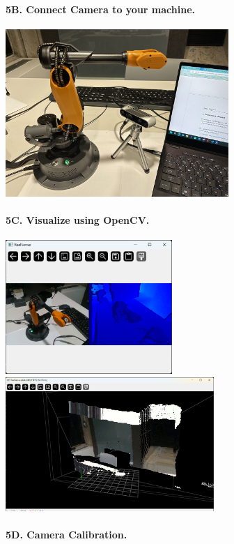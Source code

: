\paragraph{5B. Connect Camera to your machine.}
\begin{center}
    \includegraphics[height=2.5in]{image/5b.jpg}
\end{center}

\newpage
\paragraph{5C. Visualize using OpenCV.}
\begin{center}
    \includegraphics[height=2in]{image/5c.png}
    \includegraphics[height=2in]{image/5c_2.png}
\end{center}

\paragraph{5D. Camera Calibration.}
%


